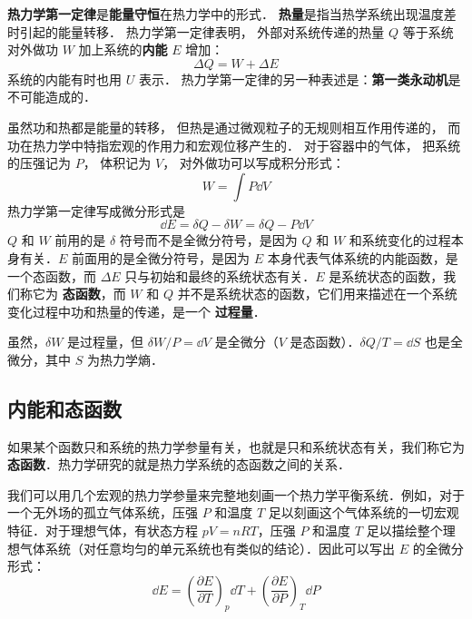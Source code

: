 
\begin{issues}
\issueDraft
\end{issues}


\textbf{热力学第一定律}是\textbf{能量守恒}在热力学中的形式． \textbf{热量}是指当热学系统出现温度差时引起的能量转移． 热力学第一定律表明， 外部对系统传递的热量 $Q$ 等于系统对外做功 $W$ 加上系统的\textbf{内能} $E$ 增加：
\begin{equation}\label{Th1Law_eq1}
\Delta Q = W + \Delta E
\end{equation}
系统的内能有时也用 $U$ 表示． 热力学第一定律的另一种表述是：\textbf{第一类永动机}是不可能造成的．

虽然功和热都是能量的转移， 但热是通过微观粒子的无规则相互作用传递的， 而功在热力学中特指宏观的作用力和宏观位移产生的． 对于容器中的气体， 把系统的压强记为 $P$， 体积记为 $V$， 对外做功可以写成积分形式：
\begin{equation}
W = \int P \dd{V}
\end{equation}
热力学第一定律写成微分形式是
\begin{equation}\label{Th1Law_eq2}
\dd E=\delta Q-\delta W=\delta Q-P\dd V
\end{equation}
$Q$ 和 $W$ 前用的是 $\delta$ 符号而不是全微分符号，是因为 $Q$ 和 $W$ 和系统变化的过程本身有关．$E$ 前面用的是全微分符号，是因为 $E$ 本身代表气体系统的内能函数，是一个态函数，而 $\Delta E$ 只与初始和最终的系统状态有关．$E$ 是系统状态的函数，我们称它为 \textbf{态函数}，而 $W$ 和 $Q$ 并不是系统状态的函数，它们用来描述在一个系统变化过程中功和热量的传递，是一个 \textbf{过程量}．

虽然，$\delta W$ 是过程量，但 $\delta W/P=\dd V$ 是全微分（$V$ 是态函数）．$\delta Q/T=\dd S$ 也是全微分，其中 $S$ 为热力学熵．

\subsection{内能和态函数}
如果某个函数只和系统的热力学参量有关，也就是只和系统状态有关，我们称它为\textbf{态函数}．热力学研究的就是热力学系统的态函数之间的关系．

我们可以用几个宏观的热力学参量来完整地刻画一个热力学平衡系统．例如，对于一个无外场的孤立气体系统，压强 $P$ 和温度 $T$ 足以刻画这个气体系统的一切宏观特征．对于理想气体，有状态方程 $pV=nRT$，压强 $P$ 和温度 $T$ 足以描绘整个理想气体系统（对任意均匀的单元系统也有类似的结论）．因此可以写出 $E$ 的全微分形式：
\begin{equation}
\dd E=\left(\frac{\partial E}{\partial T}\right)_p \dd T + \left(\frac{\partial E}{\partial P}\right)_T \dd P
\end{equation}

